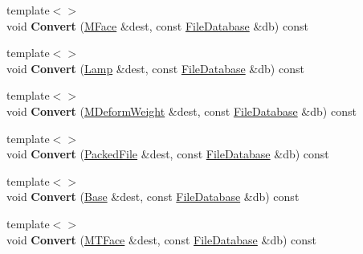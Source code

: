 \begin{DoxyCompactItemize}
\item 
\hypertarget{class_assimp_1_1_blender_1_1_structure_ae8c0618d29d7248c4bc717208c2acd89}{{\footnotesize template$<$$>$ }\\void {\bfseries Convert} (\hyperlink{struct_assimp_1_1_blender_1_1_m_face}{M\+Face} \&dest, const \hyperlink{class_assimp_1_1_blender_1_1_file_database}{File\+Database} \&db) const }\label{class_assimp_1_1_blender_1_1_structure_ae8c0618d29d7248c4bc717208c2acd89}

\item 
\hypertarget{class_assimp_1_1_blender_1_1_structure_a6e664d402158b3459b3b8b59d1771eef}{{\footnotesize template$<$$>$ }\\void {\bfseries Convert} (\hyperlink{struct_assimp_1_1_blender_1_1_lamp}{Lamp} \&dest, const \hyperlink{class_assimp_1_1_blender_1_1_file_database}{File\+Database} \&db) const }\label{class_assimp_1_1_blender_1_1_structure_a6e664d402158b3459b3b8b59d1771eef}

\item 
\hypertarget{class_assimp_1_1_blender_1_1_structure_af69c80ce06dcd279283831f46133cbc9}{{\footnotesize template$<$$>$ }\\void {\bfseries Convert} (\hyperlink{struct_assimp_1_1_blender_1_1_m_deform_weight}{M\+Deform\+Weight} \&dest, const \hyperlink{class_assimp_1_1_blender_1_1_file_database}{File\+Database} \&db) const }\label{class_assimp_1_1_blender_1_1_structure_af69c80ce06dcd279283831f46133cbc9}

\item 
\hypertarget{class_assimp_1_1_blender_1_1_structure_ab09c94f741f25fa8237c88553618232d}{{\footnotesize template$<$$>$ }\\void {\bfseries Convert} (\hyperlink{struct_assimp_1_1_blender_1_1_packed_file}{Packed\+File} \&dest, const \hyperlink{class_assimp_1_1_blender_1_1_file_database}{File\+Database} \&db) const }\label{class_assimp_1_1_blender_1_1_structure_ab09c94f741f25fa8237c88553618232d}

\item 
\hypertarget{class_assimp_1_1_blender_1_1_structure_afd89fe0f108140049636d7dfa71faac8}{{\footnotesize template$<$$>$ }\\void {\bfseries Convert} (\hyperlink{struct_assimp_1_1_blender_1_1_base}{Base} \&dest, const \hyperlink{class_assimp_1_1_blender_1_1_file_database}{File\+Database} \&db) const }\label{class_assimp_1_1_blender_1_1_structure_afd89fe0f108140049636d7dfa71faac8}

\item 
\hypertarget{class_assimp_1_1_blender_1_1_structure_acf32822fa1aa419c0496838afb9f54fb}{{\footnotesize template$<$$>$ }\\void {\bfseries Convert} (\hyperlink{struct_assimp_1_1_blender_1_1_m_t_face}{M\+T\+Face} \&dest, const \hyperlink{class_assimp_1_1_blender_1_1_file_database}{File\+Database} \&db) const }\label{class_assimp_1_1_blender_1_1_structure_acf32822fa1aa419c0496838afb9f54fb}


\end{DoxyCompactItemize}
